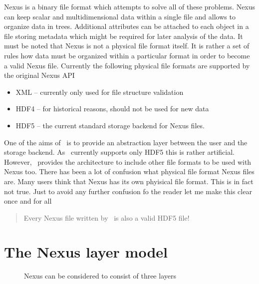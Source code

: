 Nexus is a binary file format which attempts to solve all of these problems.
Nexus can keep scalar and multidimensional data within a single file and allows
to organize data in trees. Additional attributes can be attached to each object
in a file storing metadata which might be required for later analysis of the
data. It must be noted that Nexus is not a physical file format itself. It is
rather a set of rules how data must be organized within a particular format in
order to become a valid Nexus file. Currently the following physical file
formats are supported by the original Nexus API
\begin{itemize}
\item XML -- currently only used for file structure validation
\item HDF4 -- for historical reasons, should not be used for new data
\item HDF5 -- the current standard storage backend for Nexus files. 
\end{itemize}
One of the aims of \libpniio\ is to provide an abstraction layer between the
user and the storage backend. As \libpniio\ currently supports only HDF5 this is
rather artificial. However, \libpniio\ provides the architecture to include
other file formats to be used with Nexus too. 
There has been a lot of confusion what physical file format Nexus files are.
Many users think that Nexus has its own phyisical file format. This is in fact
not true. Just to avoid any further confusion fo the reader let me make this
clear once and for all
\begin{quote}
{\huge
{\color{red}Every Nexus file written by \libpniio\ is also a valid HDF5 file!}
}
\end{quote}

\section{The Nexus layer model}

\begin{figure}[tb]
    \centering
    \begin{minipage}[c]{0.4\linewidth}
    \centering
    \end{minipage}
    \hspace{0.05\linewidth}
    \begin{minipage}[c]{0.5\linewidth}
    \caption{{\small Nexus can be considered to consist of three layers}}
    \label{fig:nxintro:layers}
    \end{minipage}
\end{figure}

